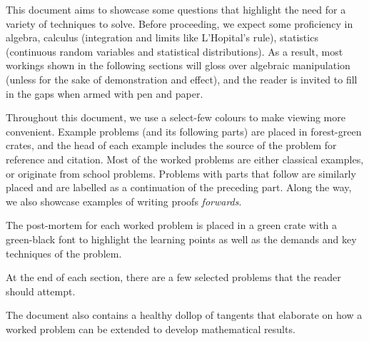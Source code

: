 \documentclass[../main.tex]{subfiles}
\begin{document}
This document aims to showcase some questions that highlight the need for a variety of techniques to solve. Before proceeding, we expect some proficiency in algebra, calculus (integration and limits like L'Hopital's rule), statistics (continuous random variables and statistical distributions). As a result, most workings shown in the following sections will gloss over algebraic manipulation (unless for the sake of demonstration and effect), and the reader is invited to fill in the gaps when armed with pen and paper.

Throughout this document, we use a select-few colours to make viewing more convenient. Example problems (and its following parts) are placed in forest-green crates, and the head of each example includes the source of the problem for reference and citation. Most of the worked problems are either classical examples, or originate from school problems. Problems with parts that follow are similarly placed and are labelled as a continuation of the preceding part. Along the way, we also showcase examples of writing proofs \textit{forwards}.

The post-mortem for each worked problem is placed in a green crate with a green-black font to highlight the learning points as well as the demands and key techniques of the problem.

At the end of each section, there are a few selected problems that the reader should attempt.

The document also contains a healthy dollop of tangents that elaborate on how a worked problem can be extended to develop mathematical results.
\end{document}

